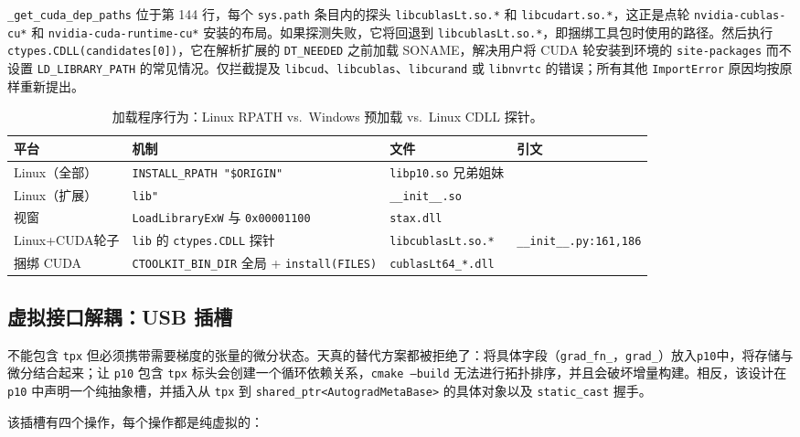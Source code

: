 \texttt{\_get\_cuda\_dep\_paths} 位于第 144 行，每个 \texttt{sys.path} 条目内的探头 \texttt{libcublasLt.so.*} 和 \texttt{libcudart.so.*}，这正是点轮 \texttt{nvidia-cublas-cu*} 和 \texttt{nvidia-cuda-runtime-cu*} 安装的布局。如果探测失败，它将回退到 \texttt{libcublasLt.so.*}，即捆绑工具包时使用的路径。然后执行 \texttt{ctypes.CDLL(candidates[0])}，它在解析扩展的 \texttt{DT\_NEEDED} 之前加载 SONAME，解决用户将 CUDA 轮安装到环境的 \texttt{site-packages} 而不设置 \texttt{LD\_LIBRARY\_PATH} 的常见情况。仅拦截提及 \texttt{libcud}、\texttt{libcublas}、\texttt{libcurand} 或 \texttt{libnvrtc} 的错误；所有其他 \texttt{ImportError} 原因均按原样重新提出。

\begin{table}[H]
\centering
\caption{加载程序行为：Linux RPATH vs.\ Windows 预加载 vs.\ Linux CDLL 探针。}
\label{tab:loader}
\small
\begin{tabular}{llll}
\toprule
平台 & 机制 & 文件 & 引文 \\
\midrule
Linux（全部） & \texttt{INSTALL\_RPATH "\$ORIGIN"} & \texttt{libp10.so} 兄弟姐妹 & \\
Linux（扩展） & \texttt{lib"} & \texttt{\_\_init\_\_.so} & \\
视窗 & \texttt{LoadLibraryExW} 与 \texttt{0x00001100} & \texttt{stax.dll} & \\
Linux+CUDA轮子 & \texttt{lib} 的 \texttt{ctypes.CDLL} 探针 & \texttt{libcublasLt.so.*} & \texttt{\_\_init\_\_.py:161,186} \\
捆绑 CUDA & \texttt{CTOOLKIT\_BIN\_DIR} 全局 + \texttt{install(FILES)} & \texttt{cublasLt64\_*.dll} & \\
\bottomrule
\end{tabular}
\end{table}

\subsection{虚拟接口解耦：USB 插槽}
\label{sec:arch:usb}

不能包含 \texttt{tpx} 但必须携带需要梯度的张量的微分状态。天真的替代方案都被拒绝了：将具体字段（\texttt{grad\_fn\_}，\texttt{grad\_}）放入\texttt{p10}中，将存储与微分结合起来；让 \texttt{p10} 包含 \texttt{tpx} 标头会创建一个循环依赖关系，\texttt{cmake --build} 无法进行拓扑排序，并且会破坏增量构建。相反，该设计在 \texttt{p10} 中声明一个纯抽象槽，并插入从 \texttt{tpx} 到 \texttt{shared\_ptr<AutogradMetaBase>} 的具体对象以及 \texttt{static\_cast} 握手。

该插槽有四个操作，每个操作都是纯虚拟的：

